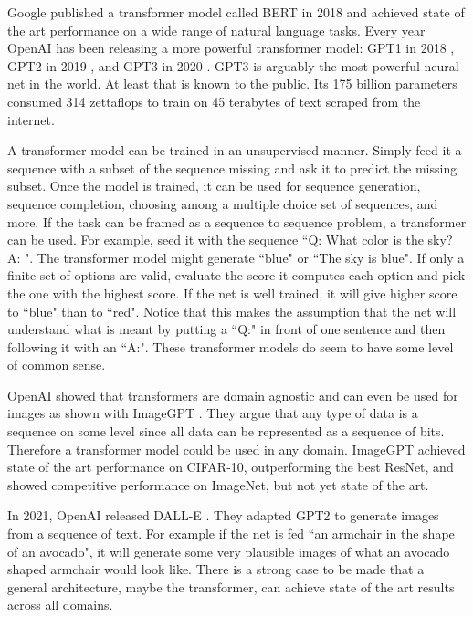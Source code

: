 Google published a transformer model called BERT in 2018 \cite{devlin2018bert} and achieved state of the art performance on a wide range of natural language tasks.  Every year OpenAI has been releasing a more powerful transformer model: GPT1 in 2018 \cite{radford2018improving}, GPT2 in 2019 \cite{radford2019language}, and GPT3 in 2020 \cite{brown2020language}.  GPT3 is arguably the most powerful neural net in the world.  At least that is known to the public.  Its 175 billion parameters consumed 314 zettaflops to train on 45 terabytes of text scraped from the internet.

A transformer model can be trained in an unsupervised manner.  Simply feed it a sequence with a subset of the sequence missing and ask it to predict the missing subset.  Once the model is trained, it can be used for sequence generation, sequence completion, choosing among a multiple choice set of sequences, and more.  If the task can be framed as a sequence to sequence problem, a transformer can be used.  For example, seed it with the sequence ``Q: What color is the sky? A: ".  The transformer model might generate ``blue" or ``The sky is blue".  If only a finite set of options are valid, evaluate the score it computes each option and pick the one with the highest score.  If the net is well trained, it will give higher score to ``blue" than to ``red".  Notice that this makes the assumption that the net will understand what is meant by putting a ``Q:" in front of one sentence and then following it with an ``A:".  These transformer models do seem to have some level of common sense.

OpenAI showed that transformers are domain agnostic and can even be used for images as shown with ImageGPT \cite{chen2020generative}.  They argue that any type of data is a sequence on some level since all data can be represented as a sequence of bits.  Therefore a transformer model could be used in any domain.  ImageGPT achieved state of the art performance on CIFAR-10, outperforming the best ResNet, and showed competitive performance on ImageNet, but not yet state of the art.

In 2021, OpenAI released DALL-E \cite{ramesh2021zero}.  They adapted GPT2 to generate images from a sequence of text.  For example if the net is fed ``an armchair in the shape of an avocado", it will generate some very plausible images of what an avocado shaped armchair would look like.  There is a strong case to be made that a general architecture, maybe the transformer, can achieve state of the art results across all domains. \\

